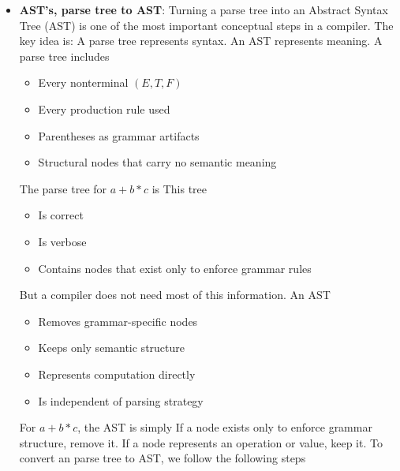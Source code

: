 \documentclass{report}
\begin{document}
\begin{itemize}
\begin{align*}
                  &\implies (E + ((E - T) * F)) \implies \cdots \implies (a + ((b-c) * d))
            .\end{align*}
        \item \textbf{AST's, parse tree to AST}: Turning a parse tree into an Abstract Syntax Tree (AST) is one of the most important conceptual steps in a compiler. The key idea is: A parse tree represents syntax. An AST represents meaning.
            \bigbreak \noindent 
            A parse tree includes
            \begin{itemize}
                \item Every nonterminal $(E, T, F)$
                \item Every production rule used
                \item Parentheses as grammar artifacts
                \item Structural nodes that carry no semantic meaning
            \end{itemize}
            The parse tree for $a+b*c$ is
            \bigbreak \noindent 
            \bigbreak \noindent 
            This tree
            \begin{itemize}
                \item Is correct
                \item Is verbose
                \item Contains nodes that exist only to enforce grammar rules
            \end{itemize}
            But a compiler does not need most of this information. An AST
            \begin{itemize}
                \item Removes grammar-specific nodes
                \item Keeps only semantic structure
                \item Represents computation directly
                \item Is independent of parsing strategy
            \end{itemize}
            For $a+b*c$, the AST is simply
            \bigbreak \noindent 
            \bigbreak \noindent 
            If a node exists only to enforce grammar structure, remove it. If a node represents an operation or value, keep it.
            \bigbreak \noindent 
            To convert an parse tree to AST, we follow the following steps
            \begin{enumerate}

\end{enumerate}
\end{itemize}
\end{document}
